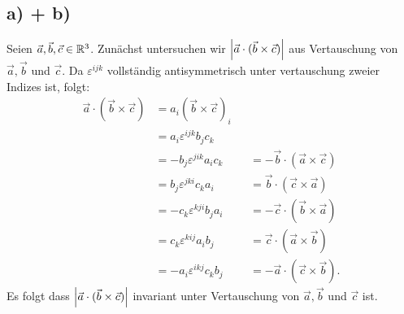 \documentclass{theozettel}
\renewcommand{\epsilon}{\varepsilon}
\begin{document}
\subsection*{a) + b)}
	Seien $\vec{a},\vec{b},\vec{c} \in \mathbb{R}^{3}$. Zunächst untersuchen wir $\qty|\vec{a} \cdot (\vec{b} \times \vec{c})|$ aus Vertauschung von $\vec{a}, \vec{b}$ und $\vec{c}$. Da $\varepsilon^{ijk}$ vollständig antisymmetrisch unter vertauschung zweier Indizes ist, folgt:
		\begin{align*}
			\vec{a} \cdot (\vec{b} \times \vec{c}) &= a_{i} (\vec{b} \times \vec{c})_{i} \\
			&= a_{i} \epsilon^{ijk}b_{j}c_{k} \\
			&= -b_{j} \epsilon^{jik}a_{i}c_{k} &&= -\vec{b} \cdot (\vec{a} \times \vec{c}) \\
			&= b_{j} \epsilon^{jki}c_{k}a_{i} &&= \vec{b} \cdot (\vec{c} \times \vec{a}) \\	
			&= -c_{k} \epsilon^{kji}b_{j}a_{i} &&= -\vec{c} \cdot (\vec{b} \times \vec{a}) \\
			&= c_{k} \epsilon^{kij}a_{i}b_{j} &&= \vec{c} \cdot (\vec{a} \times \vec{b}) \\
			&= -a_{i} \epsilon^{ikj} c_{k}b_{j} &&= -\vec{a} \cdot (\vec{c} \times \vec{b}).
		\end{align*}
	Es folgt dass $\qty|\vec{a} \cdot (\vec{b} \times \vec{c})|$ invariant unter Vertauschung von $\vec{a}, \vec{b}$ und $\vec{c}$ ist. \\
\end{document}
